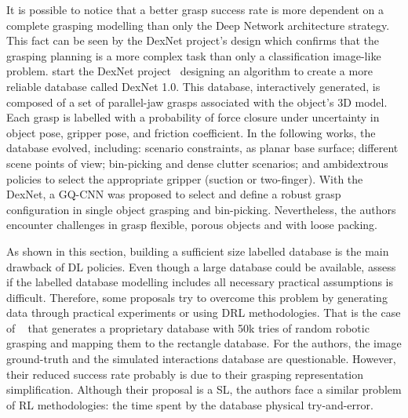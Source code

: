 It is possible to notice that a better grasp success rate is more dependent on a complete grasping modelling than only the Deep Network architecture strategy. This fact can be seen by the DexNet project's design which confirms that the grasping planning is a more complex task than only a classification image-like problem. \citeauthor{Mahler2016} start the DexNet project~\cite{Mahler2016} designing an algorithm to create a more reliable database called DexNet 1.0. This database, interactively generated, is composed of a set of parallel-jaw grasps associated with the object's 3D model. Each grasp is labelled with a probability of force closure under uncertainty in object pose, gripper pose, and friction coefficient. In the following works, the database evolved, including: scenario constraints, as planar base surface; different scene points of view; bin-picking and dense clutter scenarios; and ambidextrous policies to select the appropriate gripper (suction or two-finger). With the DexNet, a \ac{GQ-CNN} was proposed to select and define a robust grasp configuration in single object grasping and bin-picking. Nevertheless, the authors encounter challenges in grasp flexible, porous objects and with loose packing.

As shown in this section, building a sufficient size labelled database is the main drawback of \ac{DL} policies. Even though a large database could be available,  assess if the labelled database modelling includes all necessary practical assumptions is difficult. Therefore, some proposals try to overcome this problem by generating data through practical experiments or using \ac{DRL} methodologies. That is the case of \citeauthor{Pinto2015}~\cite{Pinto2015} that generates a proprietary database with 50k tries of random robotic grasping and mapping them to the rectangle database. For the authors, the image ground-truth and the simulated interactions database are questionable. However, their reduced success rate probably is due to their grasping representation simplification. Although their proposal is a \ac{SL}, the authors face a similar problem of \ac{RL} methodologies: the time spent by the database physical try-and-error.


